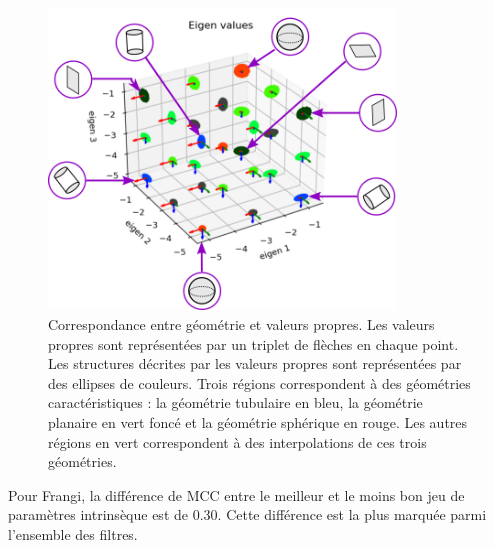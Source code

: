 \begin{figure}[!ht]
  \centering
  \includegraphics[height=8cm]{Images/eigen_meaning_3.png}
  \caption{Correspondance entre géométrie et valeurs propres. Les valeurs propres sont représentées par un triplet de flèches en chaque point. Les structures décrites par les valeurs propres sont représentées par des ellipses de couleurs. Trois régions correspondent à des géométries caractéristiques : la géométrie tubulaire en bleu, la géométrie planaire en vert foncé et la géométrie sphérique en rouge. Les autres régions en vert correspondent à des interpolations de ces trois géométries.}
  \label{fig:exemple_geometry}
\end{figure}
Pour Frangi, la différence de MCC entre le meilleur et le moins bon jeu de paramètres intrinsèque est de $0.30$. Cette différence est la plus marquée parmi l'ensemble des filtres.

